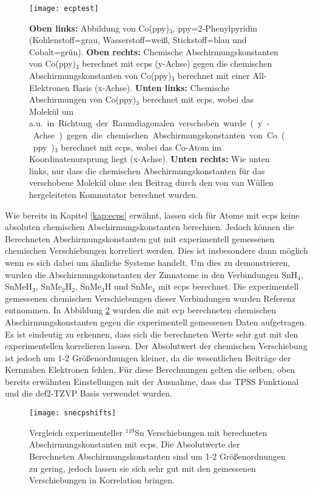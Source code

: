 \vfill
\newpage
\begin{figure}[ht!]
	\centering
	\texttt{[image: ecptest]}
	\captionsetup{figurewithin = chapter}
	\captionsetup{font=small, labelfont=bf}\caption[ECP-Testrechnungen an Co(ppy)$_3$]{\textbf{Oben links:} Abbildung von Co(ppy)$_3$, ppy=2-Phenylpyridin (Kohlenstoff=grau, Wasserstoff=weiß, Stickstoff=blau und Cobalt=grün). \textbf{Oben rechts:} Chemische Abschirmungskonstanten von Co(ppy)$_3$ berechnet mit \acp{ecp} (y-Achse) gegen die chemischen Abschirmungskonstanten von Co(ppy)$_3$ berechnet mit einer All-Elektronen Basis (x-Achse). \textbf{Unten links:} Chemische Abschirmungen von Co(ppy)$_3$  berechnet mit \acp{ecp}, wobei das Molekül um \unit[10]{a.u.} in Richtung der Raumdiagonalen verschoben wurde (y-Achse) gegen die chemischen Abschirmungskonstanten von Co(ppy)$_3$ berechnet mit \acp{ecp}, wobei das Co-Atom im Koordinatenursprung liegt (x-Achse). \textbf{Unten rechts:} Wie unten links, nur dass die chemischen Abschirmungskonstanten für das verschobene Molekül ohne den Beitrag durch den von van Wüllen hergeleiteten Kommutator berechnet wurden.}
\label{abb:coppy3test}
\end{figure}

Wie bereits in Kapitel \ref{kap:ecps} erwähnt, lassen sich für Atome mit \acp{ecp} keine absoluten chemischen Abschirmungskonstanten berechnen. Jedoch können die Berechneten Abschirmungskonstanten gut mit experimentell gemessenen chemischen Verschiebungen korreliert werden. Dies ist insbesondere dann möglich wenn es sich dabei um ähnliche Systeme handelt. Um dies zu demonstrieren, wurden die Abschirmungskonstanten der Zinnatome in den Verbindungen SnH$_4$, SnMeH$_3$, SnMe$_2$H$_2$, SnMe$_3$H und SnMe$_4$ mit \acp{ecp} berechnet. Die experimentell gemessenen chemischen Verschiebungen dieser Verbindungen wurden Referenz \cite{vivas2002dft} entnommen. In Abbildung \ref{abb:snecpshifts} wurden die mit \ac{ecp} berechneten chemischen Abschirmungskonstanten gegen die experimentell gemessenen Daten aufgetragen. Es ist eindeutig zu erkennen, dass sich die berechneten Werte sehr gut mit den experimentellen korrelieren lassen. Der Absolutwert der chemischen Verschiebung ist jedoch um 1-2 Größenordnungen kleiner, da die wesentlichen Beiträge der Kernnahen Elektronen fehlen. Für diese Berechnungen gelten die selben, oben bereits erwähnten Einstellungen mit der Ausnahme, dass das TPSS Funktional\supercite{tao2003climbing} und die def2-TZVP Basis\supercite{weigend2005balanced} verwendet wurden.
\begin{figure}[ht!]
	\centering
	\texttt{[image: snecpshifts]}
	\captionsetup{figurewithin = chapter}
	\captionsetup{font=small, labelfont=bf}\caption[Vergleich experimenteller $^{119}$Sn Verschiebungen mit berechneten Abschirmungskonstanten]{Vergleich experimenteller $^{119}$Sn Verschiebungen mit berechneten Abschirmungskonstanten mit \acp{ecp}. Die Absolutwerte der Berechneten Abschirmungskonstanten sind um 1-2 Größenordnungen zu gering, jedoch lassen sie sich sehr gut mit den gemessenen Verschiebungen in Korrelation bringen.}
\label{abb:snecpshifts}
\end{figure}
	
